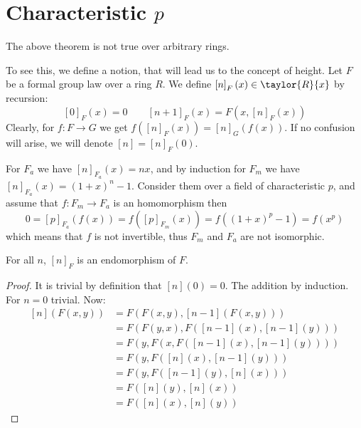 \section{Characteristic $p$}

\begin{remark*}
	The above theorem is not true over arbitrary rings.
	
	To see this, we define a notion, that will lead us to the concept of height.
	Let $F$ be a formal group law over a ring $R$. We define $\left[n\right]_F \left(x\right) \in \taylor{R}{x}$ by recursion:
	$$
		\left[0\right]_F \left(x\right) = 0
		\qquad
		\left[n+1\right]_F \left(x\right) = F\left(x, \left[n\right]_F \left(x\right)\right)
	$$
	Clearly, for $f: F \to G$ we get
	$
		f\left(\left[n\right]_F \left(x\right)\right)
		=
		\left[n\right]_G \left(f\left(x\right)\right)
	$.
	If no confusion will arise, we will denote $\left[n\right] = \left[n\right]_F\left(0\right)$.
	
	For $F_a$ we have $\left[n\right]_{F_a} \left(x\right) = nx$,
	and by induction for $F_m$ we have $\left[n\right]_{F_a} \left(x\right) = \left(1+x\right)^n - 1$.
	Consider them over a field of characteristic $p$, and assume that $f: F_m \to F_a$ is an homomorphism then
	$$
		0
		=
		\left[p\right]_{F_a} \left(f\left(x\right)\right)
		=
		f\left(\left[p\right]_{F_m} \left(x\right)\right)
		=
		f\left(\left(1+x\right)^p-1\right)
		=
		f\left(x^p\right)
	$$
	which means that $f$ is not invertible, thus $F_m$ and $F_a$ are not isomorphic.
\end{remark*}

\begin{claim*}
	For all $n$, $\left[n\right]_F$ is an endomorphism of $F$.
\end{claim*}

\begin{proof}
	It is trivial by definition that $\left[n\right]\left(0\right)=0$.
	The addition by induction. For $n=0$ trivial.
	Now:
	\begin{align*}
		\left[n\right]\left(F\left(x,y\right)\right)
		&= F\left(
			F\left(x,y\right),
			\left[n-1\right]\left(F\left(x,y\right)\right)
		\right)\\
		&= F\left(
			F\left(y,x\right),
			F\left(\left[n-1\right]\left(x\right),\left[n-1\right]\left(y\right)\right)
		\right)\\
		&= F\left(
			y,
			F\left(
				x,
				F\left(\left[n-1\right]\left(x\right),\left[n-1\right]\left(y\right)\right)
			\right)
		\right)\\
		&= F\left(
			y,
			F\left(
				\left[n\right]\left(x\right)
				,\left[n-1\right]\left(y\right)
			\right)
		\right)\\
		&= F\left(
			y,
			F\left(
				\left[n-1\right]\left(y\right),
				\left[n\right]\left(x\right)
			\right)
		\right)\\
		&= F\left(
			\left[n\right]\left(y\right),
			\left[n\right]\left(x\right)
		\right)\\
		&= F\left(
			\left[n\right]\left(x\right),
			\left[n\right]\left(y\right)
		\right)
	\end{align*}
\end{proof}

